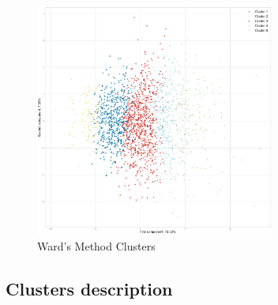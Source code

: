 \documentclass[12pt,a4paper,openany,UKenglish]{scrreprt}
\begin{document}
\begin{figure}[H]
	\centering
	\caption{Ward's Method Clusters}
	\includegraphics[width=0.7\textwidth]{../Images/FHierProjection.png}
\end{figure}

\subsection{Clusters description}
\end{document}

